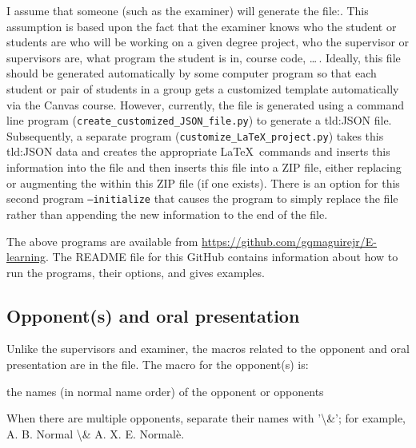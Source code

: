 I assume that someone (such as the examiner) will generate the file:\linebreak[4] . This assumption is based upon the fact that the examiner knows who the student or students are who will be working on a given degree project, who the supervisor or supervisors are, what program the student is in, course code, \ldots\,. Ideally, this file should be generated automatically by some computer program so that each student or pair of students in a group gets a customized template automatically via the Canvas course. However, currently, the file is generated using a command line program (\texttt{create\_customized\_JSON\_file.py}) to generate a \gls{tld:JSON} file. Subsequently, a separate program (\texttt{customize\_LaTeX\_project.py}) takes this \gls{tld:JSON} data and creates the appropriate \LaTeX\ commands and inserts this information into the file and then inserts this file into a ZIP file, either replacing or augmenting the  within this ZIP file (if one exists). There is an option for this second program \texttt{--initialize} that causes the program to simply replace the file rather than appending the new information to the end of the file.

The above programs are available from \url{https://github.com/gqmaguirejr/E-learning}. The README file for this GitHub contains information about how to run the programs, their options, and gives examples.

\subsection{Opponent(s) and oral presentation}
\label{sec:opponentMacros}
Unlike the supervisors and examiner, the macros related to the opponent and oral presentation are in the  file.
The macro for the opponent(s) is: 
\begin{description}[leftmargin=!, labelwidth =\widthof{\texttt{\textbackslash secondAuthorsFirstname\{\}}}]
\item [\texttt{\textbackslash opponentsNames\{\}}] the names (in normal name order) of the opponent or opponents
\end{description}
When there are multiple opponents, separate their names with '\textbackslash \&'; for example, A. B. Normal \textbackslash \& A. X. E. Normalè.

